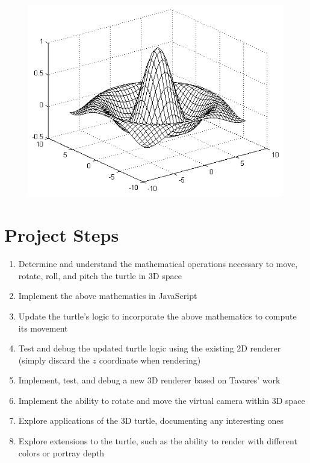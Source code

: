 \documentclass[12pt]{article}
\begin{document}
\begin{figure}[h]
\includegraphics[scale=0.5]{3dmesh}
\centering
\end{figure}

\section{Project Steps}

\begin{enumerate}
\item Determine and understand the mathematical operations necessary to move, rotate, roll, and pitch the turtle in 3D space
\item Implement the above mathematics in JavaScript
\item Update the turtle's logic to incorporate the above mathematics to compute its movement
\item Test and debug the updated turtle logic using the existing 2D renderer (simply discard the $z$ coordinate when rendering)
\item Implement, test, and debug a new 3D renderer based on Tavares' work
\item Implement the ability to rotate and move the virtual camera within 3D space
\item Explore applications of the 3D turtle, documenting any interesting ones
\item Explore extensions to the turtle, such as the ability to render with different colors or portray depth
\end{enumerate}
\end{document}
